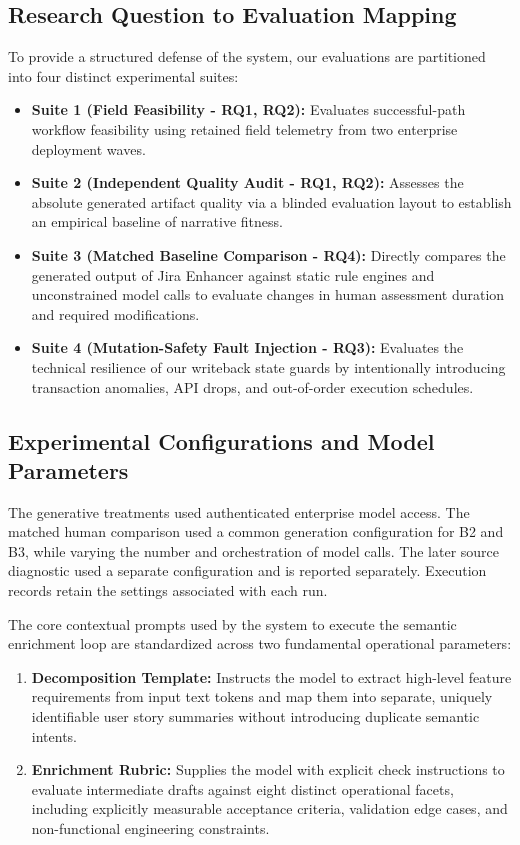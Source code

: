 \documentclass[pdflatex,sn-basic]{sn-jnl}
\begin{document}
\subsection{Research Question to Evaluation Mapping}
To provide a structured defense of the system, our evaluations are partitioned into four distinct experimental suites:
\begin{itemize}
    \item \textbf{Suite 1 (Field Feasibility - RQ1, RQ2):} Evaluates successful-path workflow feasibility using retained field telemetry from two enterprise deployment waves.
    \item \textbf{Suite 2 (Independent Quality Audit - RQ1, RQ2):} Assesses the absolute generated artifact quality via a blinded evaluation layout to establish an empirical baseline of narrative fitness.
    \item \textbf{Suite 3 (Matched Baseline Comparison - RQ4):} Directly compares the generated output of Jira Enhancer against static rule engines and unconstrained model calls to evaluate changes in human assessment duration and required modifications.
    \item \textbf{Suite 4 (Mutation-Safety Fault Injection - RQ3):} Evaluates the technical resilience of our writeback state guards by intentionally introducing transaction anomalies, API drops, and out-of-order execution schedules.
\end{itemize}

\subsection{Experimental Configurations and Model Parameters}
The generative treatments used authenticated enterprise model access. The matched human comparison used a common generation configuration for B2 and B3, while varying the number and orchestration of model calls. The later source diagnostic used a separate configuration and is reported separately. Execution records retain the settings associated with each run.

The core contextual prompts used by the system to execute the semantic enrichment loop are standardized across two fundamental operational parameters:
\begin{enumerate}
    \item \textbf{Decomposition Template:} Instructs the model to extract high-level feature requirements from input text tokens and map them into separate, uniquely identifiable user story summaries without introducing duplicate semantic intents.
    \item \textbf{Enrichment Rubric:} Supplies the model with explicit check instructions to evaluate intermediate drafts against eight distinct operational facets, including explicitly measurable acceptance criteria, validation edge cases, and non-functional engineering constraints.
\end{enumerate}
\end{document}
